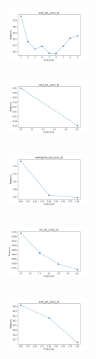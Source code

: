 \begin{figure}[H]
    \hfill
    \begin{subfigure}
        \centering
        \includegraphics[width=0.234\textwidth]{img/copkm2/ecoli_set_const_10_589741062_time.png}
    \end{subfigure}
    \hfill
    \begin{subfigure}
        \centering
        \includegraphics[width=0.234\textwidth]{img/copkm2/rand_set_const_10_589741062_time.png}
    \end{subfigure}
    \hfill
    \begin{subfigure}
        \centering
        \includegraphics[width=0.234\textwidth]{img/copkm2/newthyroid_set_const_10_589741062_time.png}
    \end{subfigure}
    \hfill
    \begin{subfigure}
        \centering
        \includegraphics[width=0.234\textwidth]{img/copkm2/iris_set_const_10_277451237_time.png}
    \end{subfigure}
    \hfill
    \begin{subfigure}
        \centering
        \includegraphics[width=0.234\textwidth]{img/copkm2/ecoli_set_const_10_277451237_time.png}
    \end{subfigure}
    \hfill
    \begin{subfigure}

\end{subfigure}
\end{figure}
